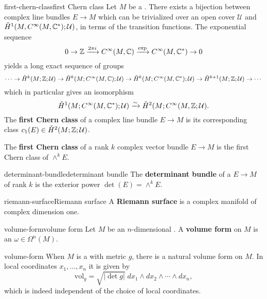 \begin{topic}{first-chern-class}{first Chern class}
    Let $M$ be a . There exists a bijection between complex line bundles $E \to M$ which can be trivialized over an open cover $\mathcal{U}$ and $\check{H}^1(M, C^\infty(M, \mathbb{C}^*); \mathcal{U})$, in terms of the transition functions. The exponential sequence
    \[ 0 \to \mathbb{Z} \xrightarrow{2 \pi i} C^\infty(M, \mathbb{C}) \xrightarrow{\exp} C^\infty(M, \mathbb{C}^*) \to 0 \]
    yields a long exact sequence of  groups
    \[ \cdots \to \check{H}^k(M; \mathbb{Z}; \mathcal{U}) \to \check{H}^k(M; C^\infty(M, \mathbb{C}); \mathcal{U}) \to \check{H}^k(M; C^\infty(M, \mathbb{C}^*); \mathcal{U}) \to \check{H}^{k + 1}(M; \mathbb{Z}; \mathcal{U}) \to \cdots \]
    which in particular gives an isomorphism
    \[ \check{H}^1(M; C^\infty(M, \mathbb{C}^*); \mathcal{U}) \xrightarrow{\sim} \check{H}^2(M; C^\infty(M, \mathbb{Z}; \mathcal{U}) . \]
    The \textbf{first Chern class} of a complex line bundle $E \to M$ is its corresponding class $c_1(E) \in \check{H}^2(M; \mathbb{Z}; \mathcal{U})$.
    
    The \textbf{first Chern class} of a rank $k$ complex vector bundle $E \to M$ is the first Chern class of $\wedge^k E$.
\end{topic}

\begin{topic}{determinant-bundle}{determinant bundle}
    The \textbf{determinant bundle} of a  $E \to M$ of rank $k$ is the exterior power $\det(E) = \wedge^k E$.
\end{topic}

\begin{topic}{riemann-surface}{Riemann surface}
    A \textbf{Riemann surface} is a  complex manifold of complex dimension one.
\end{topic}

\begin{topic}{volume-form}{volume form}
    Let $M$ be an $n$-dimensional . A \textbf{volume form} on $M$ is an  $\omega \in \Omega^n(M)$.
\end{topic}

\begin{example}{volume-form}
    When $M$ is a  with metric $g$, there is a natural volume form on $M$. In local coordinates $x_1, \ldots, x_n$ it is given by
    \[ \text{vol}_g = \sqrt{|\det g|} \; dx_1 \wedge dx_2 \wedge \cdots \wedge dx_n , \]
    which is indeed independent of the choice of local coordinates.
\end{example}

